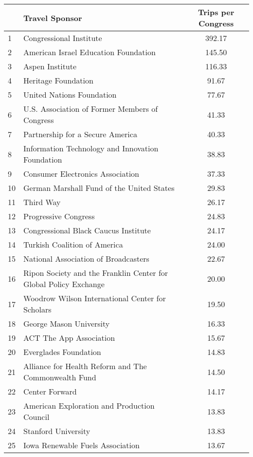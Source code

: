 \documentclass[12pt]{article}
\begin{document}
\begin{table}[ht]
\centering
\begin{tabular}{llc}
  \hline
 & Travel Sponsor & Trips per Congress \\
  \hline
  1 & Congressional Institute & 392.17 \\
    2 & American Israel Education Foundation & 145.50 \\
    3 & Aspen Institute & 116.33 \\
    4 & Heritage Foundation & 91.67 \\
    5 & United Nations Foundation & 77.67 \\
    6 & U.S. Association of Former Members of Congress & 41.33 \\
    7 & Partnership for a Secure America & 40.33 \\ 
    8 & Information Technology and Innovation Foundation & 38.83 \\
    9 & Consumer Electronics Association & 37.33 \\
    10 & German Marshall Fund of the United States & 29.83 \\
    11 & Third Way & 26.17 \\
    12 & Progressive Congress & 24.83 \\
    13 & Congressional Black Caucus Institute & 24.17 \\
    14 & Turkish Coalition of America & 24.00 \\
    15 & National Association of Broadcasters & 22.67 \\
    16 & Ripon Society and the Franklin Center for Global Policy Exchange & 20.00 \\
    17 & Woodrow Wilson International Center for Scholars & 19.50 \\
    18 & George Mason University & 16.33 \\
    19 & ACT The App Association & 15.67 \\
    20 & Everglades Foundation & 14.83 \\
    21 & Alliance for Health Reform and The Commonwealth Fund & 14.50 \\
    22 & Center Forward & 14.17 \\
    23 & American Exploration and Production Council & 13.83 \\
    24 & Stanford University & 13.83 \\
    25 & Iowa Renewable Fuels Association & 13.67 \\
   \hline
\end{tabular}
\end{table}
\end{document}
